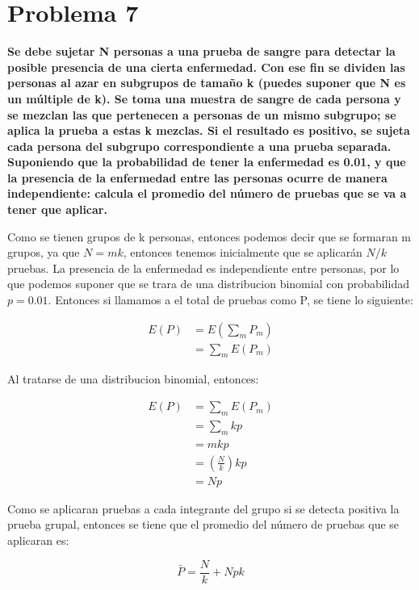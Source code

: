 \section*{Problema 7}
\textbf{Se debe sujetar N personas a una prueba de sangre para detectar la posible presencia de una cierta enfermedad. Con ese fin se dividen las personas al azar en subgrupos de tamaño k (puedes suponer que N es un múltiple de k). Se toma una muestra de sangre de cada persona y se mezclan las que pertenecen a personas de un mismo subgrupo; se aplica la prueba a estas k mezclas. Si el resultado es positivo, se sujeta cada persona del subgrupo correspondiente a una prueba separada. Suponiendo que la probabilidad de tener la enfermedad es 0.01, y que la presencia de la enfermedad entre las personas ocurre de manera independiente: calcula el promedio del número de pruebas que se va a tener que aplicar.}

Como se tienen grupos de k personas, entonces podemos decir que se formaran m grupos, ya que $N=mk$, entonces tenemos inicialmente que se aplicarán $N/k$ pruebas. La presencia de la enfermedad es independiente entre personas, por lo que podemos suponer que se trara de una distribucion binomial con probabilidad $p=0.01$. Entonces si llamamos a el total de pruebas como P, se tiene lo siguiente:

\begin{align*}
    E(P) & = E\left(\sum_m P_m \right) \\
         & = \sum_m E (P_m)
\end{align*}

Al tratarse de una distribucion binomial, entonces:

\begin{align*}
    E(P) & =  \sum_m E(P_m)              \\
         & = \sum_m kp                   \\
         & = mkp                         \\
         & = \left(\frac{N}{k}\right) kp \\
         & = Np
\end{align*}

Como se aplicaran pruebas a cada integrante del grupo si se detecta positiva la prueba grupal, entonces se tiene que el promedio del número de pruebas que se aplicaran es:

\begin{equation*}
    \bar{P} = \frac{N}{k} + Npk
\end{equation*}